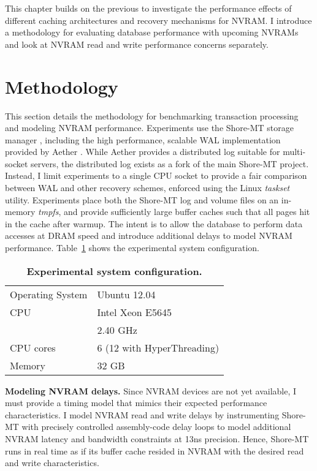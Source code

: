 This chapter builds on the previous to investigate the performance effects of different caching architectures and recovery mechanisms for NVRAM.
I introduce a methodology for evaluating database performance with upcoming NVRAMs and look at NVRAM read and write performance concerns separately.

\section{Methodology}
\label{sec:OLTP_design:Methodology}

This section details the methodology for benchmarking transaction processing and modeling NVRAM performance.
Experiments use the Shore-MT storage manager \cite{JohnsonPandis09}, including the high performance, scalable WAL implementation provided by Aether \cite{JohnsonPandis10}.
While Aether provides a distributed log suitable for multi-socket servers, the distributed log exists as a fork of the main Shore-MT project.
Instead, I limit experiments to a single CPU socket to provide a fair comparison between WAL and other recovery schemes, enforced using the Linux \emph{taskset} utility.
Experiments place both the Shore-MT log and volume files on an in-memory \emph{tmpfs}, and provide sufficiently large buffer caches such that all pages hit in the cache after warmup.
The intent is to allow the database to perform data accesses at DRAM speed and introduce additional delays to model NVRAM performance.
Table~\ref{table::Specs} shows the experimental system configuration.

\begin{table}
  \centering
  \begin{tabular}{l l}
    \hline
    Operating System & Ubuntu 12.04 \\
    CPU & Intel Xeon E5645 \\
    & 2.40 GHz \\
    CPU cores & 6 (12 with HyperThreading) \\
    Memory & 32 GB \\
    \hline
  \end{tabular}
  \caption{\textbf{Experimental system configuration.}}
  \label{table::Specs}
\end{table}

\textbf{Modeling NVRAM delays.}
Since NVRAM devices are not yet available, I must provide a timing model that mimics their expected performance characteristics.
I model NVRAM read and write delays by instrumenting Shore-MT with precisely controlled assembly-code delay loops to model additional NVRAM latency and bandwidth constraints at 13ns precision.
Hence, Shore-MT runs in real time as if its buffer cache resided in NVRAM with the desired read and write characteristics.

